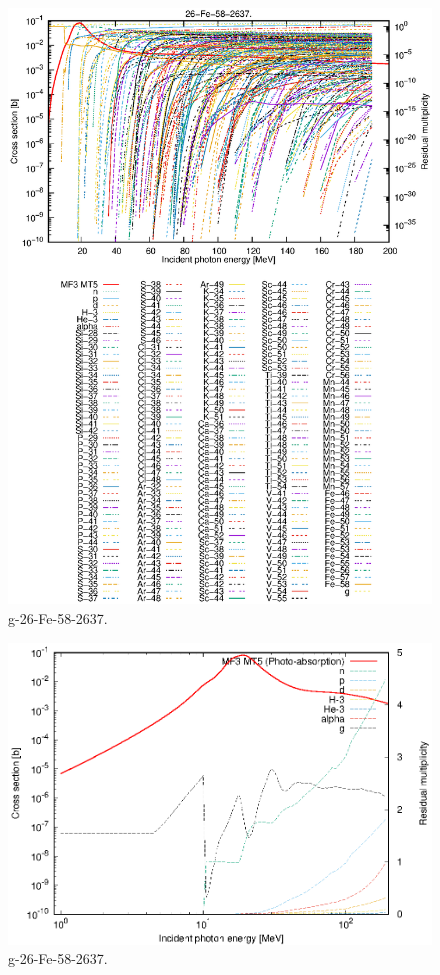 \begin{figure}
 \includegraphics[width=\linewidth]{eps/g_26-Fe-58_2637.eps}
  \caption{g-26-Fe-58-2637.}
\end{figure}
\newpage \clearpage

\begin{figure}
 \includegraphics[width=\linewidth]{eps-log/g_26-Fe-58_2637.eps}
 \caption{g-26-Fe-58-2637.}
\end{figure}
\newpage \clearpage

